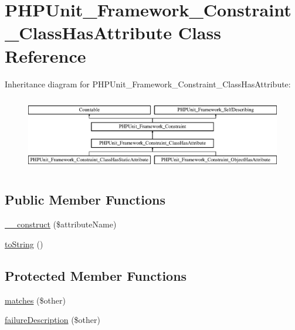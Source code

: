 \hypertarget{class_p_h_p_unit___framework___constraint___class_has_attribute}{}\section{P\+H\+P\+Unit\+\_\+\+Framework\+\_\+\+Constraint\+\_\+\+Class\+Has\+Attribute Class Reference}
\label{class_p_h_p_unit___framework___constraint___class_has_attribute}
Inheritance diagram for P\+H\+P\+Unit\+\_\+\+Framework\+\_\+\+Constraint\+\_\+\+Class\+Has\+Attribute\+:\begin{figure}[H]
\begin{center}
\leavevmode
\includegraphics[height=3.313610cm]{class_p_h_p_unit___framework___constraint___class_has_attribute}
\end{center}
\end{figure}
\subsection*{Public Member Functions}
\begin{DoxyCompactItemize}
\item 
\mbox{\hyperlink{class_p_h_p_unit___framework___constraint___class_has_attribute_ad932c6cae0432a4fc94b6f84a0be9464}{\+\_\+\+\_\+construct}} (\$attribute\+Name)
\item 
\mbox{\hyperlink{class_p_h_p_unit___framework___constraint___class_has_attribute_a5558c5d549f41597377fa1ea8a1cefa3}{to\+String}} ()
\end{DoxyCompactItemize}
\subsection*{Protected Member Functions}
\begin{DoxyCompactItemize}
\item 
\mbox{\hyperlink{class_p_h_p_unit___framework___constraint___class_has_attribute_a9c9c337de483bbdbb9fa249a6c7c9cc5}{matches}} (\$other)
\item 
\mbox{\hyperlink{class_p_h_p_unit___framework___constraint___class_has_attribute_aaabb679273bfb812df4d81c283754a59}{failure\+Description}} (\$other)
\end{DoxyCompactItemize}
